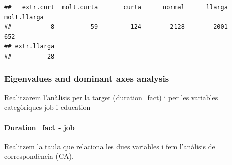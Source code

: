 \documentclass[
]{article}
\newenvironment{Shaded}{\begin{snugshade}}{\end{snugshade}}
\newcommand{\AttributeTok}[1]{\textcolor[rgb]{0.77,0.63,0.00}{#1}}
\newcommand{\DecValTok}[1]{\textcolor[rgb]{0.00,0.00,0.81}{#1}}
\newcommand{\FunctionTok}[1]{\textcolor[rgb]{0.00,0.00,0.00}{#1}}
\newcommand{\NormalTok}[1]{#1}
\newcommand{\OtherTok}[1]{\textcolor[rgb]{0.56,0.35,0.01}{#1}}
\newcommand{\SpecialCharTok}[1]{\textcolor[rgb]{0.00,0.00,0.00}{#1}}
\newcommand{\StringTok}[1]{\textcolor[rgb]{0.31,0.60,0.02}{#1}}
\begin{document}
\begin{Shaded}
\end{Shaded}

\begin{verbatim}
##   extr.curt  molt.curta       curta      normal      llarga molt.llarga 
##           8          59         124        2128        2001         652 
## extr.llarga 
##          28
\end{verbatim}

\hypertarget{eigenvalues-and-dominant-axes-analysis}{%
\subsubsection{Eigenvalues and dominant axes
analysis}\label{eigenvalues-and-dominant-axes-analysis}}

Realitzarem l'anàlisis per la target (duration\_fact) i per les
variables categòriques job i education

\hypertarget{duration_fact---job}{%
\paragraph{Duration\_fact - job}\label{duration_fact---job}}

Realitzem la taula que relaciona les dues variables i fem l'anàlisis de
correspondència (CA).
\end{document}
